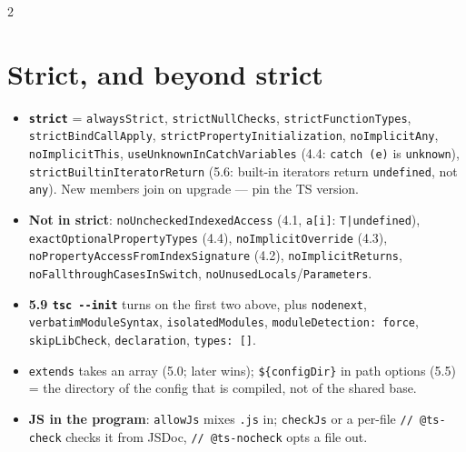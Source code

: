 \documentclass[8pt]{extarticle}
\newcommand\ct[1]{\texttt{#1}}
\newcommand\dd{-\pdfonly{\kern0pt}-}
\begin{document}
\begin{multicols}{2}
\section{Strict, and beyond strict}
\begin{itemize}
  \item \ct{\textbf{strict}} = \ct{alwaysStrict}, \ct{strictNullChecks}, \ct{strictFunctionTypes},
        \ct{strictBindCallApply}, \ct{strictPropertyInitialization}, \ct{noImplicitAny},
        \ct{noImplicitThis}, \ct{useUnknownInCatchVariables} (4.4: \ct{catch (e)} is
        \ct{unknown}), \ct{strictBuiltinIteratorReturn} (5.6: built-in iterators return
        \ct{undefined}, not \ct{any}). New members join on upgrade — pin the TS version.
  \item \textbf{Not in strict}: \ct{noUncheckedIndexedAccess} (4.1, \ct{a[i]}: \ct{T|undefined}),
        \ct{exactOptionalPropertyTypes} (4.4), \ct{noImplicitOverride} (4.3),
        \ct{noPropertyAccessFromIndexSignature} (4.2), \ct{noImplicitReturns},
        \ct{noFallthroughCasesInSwitch}, \ct{noUnusedLocals}/\ct{Parameters}.
  \item \textbf{5.9 \ct{tsc \dd{}init}} turns on the first two above, plus \ct{nodenext},
        \ct{verbatimModuleSyntax}, \ct{isolatedModules}, \ct{moduleDetection: force},
        \ct{skipLibCheck}, \ct{declaration}, \ct{types: []}.
  \item \ct{extends} takes an array (5.0; later wins); \ct{\$\{configDir\}} in path options (5.5)
        = the directory of the config that is compiled, not of the shared base.
  \item \textbf{JS in the program}: \ct{allowJs} mixes \ct{.js} in; \ct{checkJs} or a per-file
        \ct{// @ts-check} checks it from JSDoc, \ct{// @ts-nocheck} opts a file out.
\end{itemize}


\end{multicols}
\end{document}
